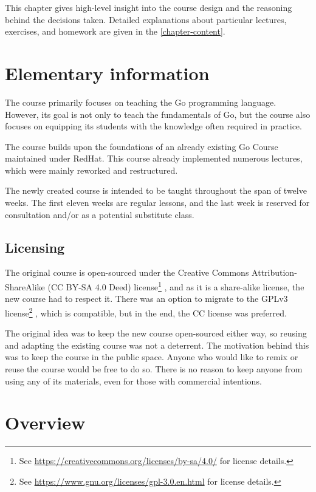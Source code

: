 \documentclass[
  digital,
  color,
  oneside,
  nosansbold,
  nocolorbold,
  lof,
  lot,
]{fithesis4}
\begin{document}
This chapter gives high-level insight into the course design and the reasoning behind the decisions taken. Detailed explanations about particular lectures, exercises, and homework are given in the \cref{chapter-content}.

\section{Elementary information}

The course primarily focuses on teaching the Go programming language. However, its goal is not only to teach the fundamentals of Go, but the course also focuses on equipping its students with the knowledge often required in practice.

The course builds upon the foundations of an already existing Go Course maintained under RedHat\cite{redhat-go-course}. This course already implemented numerous lectures, which were mainly reworked and restructured.

The newly created course is intended to be taught throughout the span of twelve weeks. The first eleven weeks are regular lessons, and the last week is reserved for consultation and/or as a potential substitute class.

\subsection{Licensing}

The original course is open-sourced under the Creative Commons Attribution-ShareAlike (CC BY-SA 4.0 Deed) license\footnote{See \url{https://creativecommons.org/licenses/by-sa/4.0/} for license details.}
, and as it is a share-alike license, the new course had to respect it. There was an option to migrate to the GPLv3 license\footnote{See \url{https://www.gnu.org/licenses/gpl-3.0.en.html} for license details.}
, which is compatible, but in the end, the CC license was preferred.

The original idea was to keep the new course open-sourced either way, so reusing and adapting the existing course was not a deterrent. The motivation behind this was to keep the course in the public space. Anyone who would like to remix or reuse the course would be free to do so. There is no reason to keep anyone from using any of its materials, even for those with commercial intentions.

\section{Overview}\label{design-overview}
\end{document}
